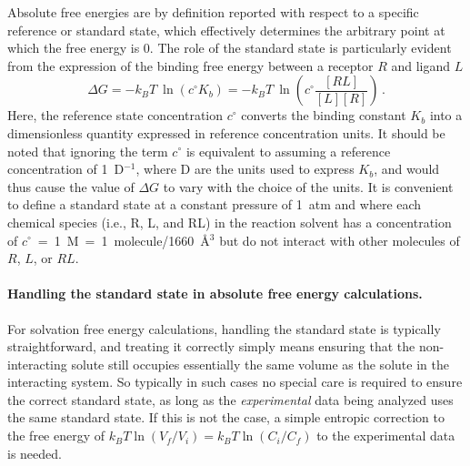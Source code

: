 \documentclass[9pt,bestpractices,pubversion]{livecoms}
\begin{document}
Absolute free energies are by definition reported with respect to a specific reference or standard state, which effectively determines the arbitrary point at which the free energy is 0.
The role of the standard state is particularly evident from the expression of the binding free energy between a receptor $R$ and ligand $L$
\begin{equation} \label{eq:DGfromKAB}
    \Delta G = -k_BT ~ \ln \left( c^{\circ} K_b \right)  = -k_BT ~ \ln\left( c^{\circ} \frac{[RL]}{[L][R]} \right) \, .
\end{equation}
Here, the reference state concentration $c^{\circ}$ converts the binding constant $K_b$ into a dimensionless quantity expressed in reference concentration units.
It should be noted that ignoring the term $c^{\circ}$ is equivalent to assuming a reference concentration of 1~D$^{-1}$, where D are the units used to express $K_b$, and would thus cause the value of $\Delta G$ to vary with the choice of the units.
It is convenient to define a standard state at a constant pressure of 1~atm and where each chemical species (i.e., R, L, and RL) in the reaction solvent has a concentration of $c^{\circ}$~=~1~M~=~1~molecule/1660~\r{A}$^3$ but do not interact with other molecules of $R$, $L$, or $RL$.

\paragraph{Handling the standard state in absolute free energy calculations.}
For solvation free energy calculations, handling the standard state is typically straightforward, and treating it correctly simply means ensuring that the non-interacting solute still occupies essentially the same volume as the solute in the interacting system.
So typically in such cases no special care is required to ensure the correct standard state, as long as the \emph{experimental} data being analyzed uses the same standard state.
If this is not the case, a simple entropic correction to the free energy of $k_B T\ln (V_f/V_i) = k_B T \ln (C_i/C_f)$ to the experimental data is needed.
\end{document}
